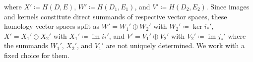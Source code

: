 \documentclass[letterpaper,11pt]{article}
\theoremstyle{plain}
\theoremstyle{definition}
\newcommand{\im}{\operatorname{im}}
\newcounter{li}
\newcommand\michal[1]{\textcolor{ForestGreen}{[ML: #1]}}
\begin{document}
where $X'\coloneqq H(D,E)$, $W'\coloneqq H(D_1,E_1)$, and $V'\coloneqq H(D_2,E_2)$. 
Since images and kernels constitute direct summands of respective vector spaces,
    these homology vector spaces split as $W'=W_1'\oplus W_2'$ with 
    $W_2'\coloneqq \ker i_\ast'$, $X'=X_1'\oplus X_2'$ with $X_1'\coloneqq\im i_\ast'$,
    and $V'=V_1'\oplus V_2'$ with $V_2'\coloneqq\im j_\ast'$ 
where the summands $W_1'$, $X_2'$, and $V_1'$ are not uniquely determined. We work with a fixed choice for them.
\end{document}
